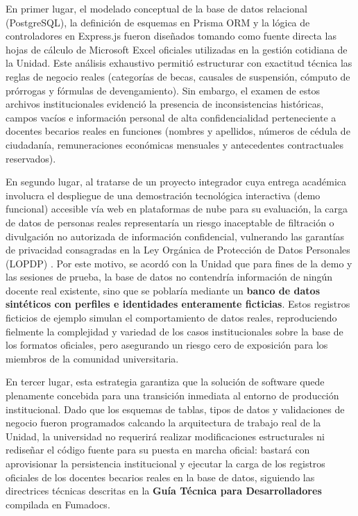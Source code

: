 En primer lugar, el modelado conceptual de la base de datos relacional (PostgreSQL), la definición de esquemas en Prisma ORM y la lógica de controladores en Express.js fueron diseñados tomando como fuente directa las hojas de cálculo de Microsoft Excel oficiales utilizadas en la gestión cotidiana de la Unidad. Este análisis exhaustivo permitió estructurar con exactitud técnica las reglas de negocio reales (categorías de becas, causales de suspensión, cómputo de prórrogas y fórmulas de devengamiento). Sin embargo, el examen de estos archivos institucionales evidenció la presencia de inconsistencias históricas, campos vacíos e información personal de alta confidencialidad perteneciente a docentes becarios reales en funciones (nombres y apellidos, números de cédula de ciudadanía, remuneraciones económicas mensuales y antecedentes contractuales reservados).

En segundo lugar, al tratarse de un proyecto integrador cuya entrega académica involucra el despliegue de una demostración tecnológica interactiva (demo funcional) accesible vía web en plataformas de nube para su evaluación, la carga de datos de personas reales representaría un riesgo inaceptable de filtración o divulgación no autorizada de información confidencial, vulnerando las garantías de privacidad consagradas en la Ley Orgánica de Protección de Datos Personales (LOPDP) \cite{lopdp_ecuador}. Por este motivo, se acordó con la Unidad que para fines de la demo y las sesiones de prueba, la base de datos no contendría información de ningún docente real existente, sino que se poblaría mediante un \textbf{banco de datos sintéticos con perfiles e identidades enteramente ficticias}. Estos registros ficticios de ejemplo simulan el comportamiento de datos reales, reproduciendo fielmente la complejidad y variedad de los casos institucionales sobre la base de los formatos oficiales, pero asegurando un riesgo cero de exposición para los miembros de la comunidad universitaria.

En tercer lugar, esta estrategia garantiza que la solución de software quede plenamente concebida para una transición inmediata al entorno de producción institucional. Dado que los esquemas de tablas, tipos de datos y validaciones de negocio fueron programados calcando la arquitectura de trabajo real de la Unidad, la universidad no requerirá realizar modificaciones estructurales ni rediseñar el código fuente para su puesta en marcha oficial: bastará con aprovisionar la persistencia institucional y ejecutar la carga de los registros oficiales de los docentes becarios reales en la base de datos, siguiendo las directrices técnicas descritas en la \textbf{Guía Técnica para Desarrolladores} compilada en Fumadocs.

